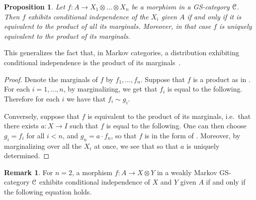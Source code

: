 \documentclass[a4paper,UKenglish,numberwithinsect,cleveref, autoref, thm-restate]{lipics-v2021}
\theoremstyle{plain} %
\newtheorem{myproposition}[mytheorem]{Proposition}
\theoremstyle{definition} %
\newtheorem{myremark}[mytheorem]{Remark}
\begin{document}
\begin{myproposition}\label{eqcondind}
 Let $f:A\to X_1\otimes\dots\otimes X_n$ be a morphism in a GS-category $\mathcal{C}$. Then $f$ exhibits conditional independence of the $X_i$ given $A$ if and only if it is equivalent to the product of all its marginals.
 Moreover, in that case $f$ is \emph{uniquely} equivalent to the product of its marginals.
\end{myproposition}

This generalizes the fact that, in Markov categories, a distribution exhibiting conditional independence is the product of its marginals~\cite[Section~12]{Fritz_2020}.

\begin{proof}
 Denote the marginals of $f$ by $f_1,\dots,f_n$.
 Suppose that $f$ is a product as in . For each $i=1,\dots,n$, by marginalizing, we get that $f_i$ is equal to the following.
 Therefore for each $i$ we have that $f_i\sim g_i$. 
 
 Conversely, suppose that $f$ is equivalent to the product of its marginals, i.e.~that there exists $a:X\to I$ such that $f$ is equal to the following.
 One can then choose $g_i=f_i$ for all $i<n$, and $g_n = a\cdot f_n$, so that $f$ is in the form of .
 Moreover, by marginalizing over all the $X_i$ at once, we see that 
 so that $a$ is uniquely determined.
\end{proof} 
 
\begin{myremark}
 For $n=2$, a morphism $f:A\to X\otimes Y$ in a weakly Markov GS-category $\mathcal{C}$ exhibits conditional independence of $X$ and $Y$ given $A$ 
 if and only if the following equation holds.
\end{myremark}
\end{document}
